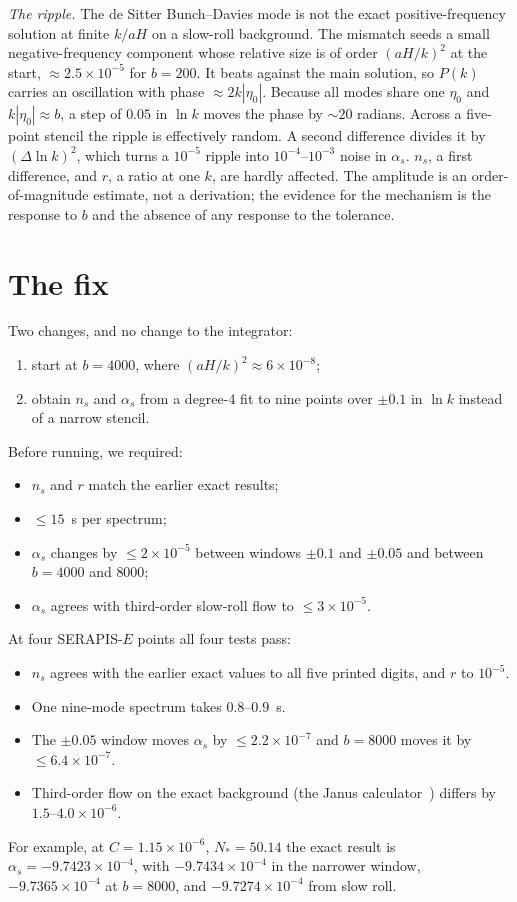 \documentclass[aps,prd,twocolumn,superscriptaddress,nofootinbib,showkeys]{revtex4-2}
\begin{document}
\emph{The ripple.} The de Sitter Bunch--Davies mode is not the exact positive-frequency solution at finite $k/aH$ on a slow-roll background. The mismatch seeds a small negative-frequency component whose relative size is of order $(aH/k)^2$ at the start, $\approx2.5\times10^{-5}$ for $b=200$. It beats against the main solution, so $P(k)$ carries an oscillation with phase $\approx2k|\eta_0|$. Because all modes share one $\eta_0$ and $k|\eta_0|\approx b$, a step of $0.05$ in $\ln k$ moves the phase by $\sim20$ radians. Across a five-point stencil the ripple is effectively random. A second difference divides it by $(\Delta\ln k)^2$, which turns a $10^{-5}$ ripple into $10^{-4}$--$10^{-3}$ noise in $\alpha_s$. $n_s$, a first difference, and $r$, a ratio at one $k$, are hardly affected. The amplitude is an order-of-magnitude estimate, not a derivation; the evidence for the mechanism is the response to $b$ and the absence of any response to the tolerance.

\section{The fix}
Two changes, and no change to the integrator:
\begin{enumerate}
\item start at $b=4000$, where $(aH/k)^2\approx6\times10^{-8}$;
\item obtain $n_s$ and $\alpha_s$ from a degree-4 fit to nine points over $\pm0.1$ in $\ln k$ instead of a narrow stencil.
\end{enumerate}
Before running, we required:
\begin{itemize}
\item[(T1)] $n_s$ and $r$ match the earlier exact results;
\item[(T2)] $\le15$~s per spectrum;
\item[(T3)] $\alpha_s$ changes by $\le2\times10^{-5}$ between windows $\pm0.1$ and $\pm0.05$ and between $b=4000$ and $8000$;
\item[(T4)] $\alpha_s$ agrees with third-order slow-roll flow to $\le3\times10^{-5}$.
\end{itemize}

At four SERAPIS-$E$ points all four tests pass:
\begin{itemize}
\item $n_s$ agrees with the earlier exact values to all five printed digits, and $r$ to $10^{-5}$.
\item One nine-mode spectrum takes $0.8$--$0.9$~s.
\item The $\pm0.05$ window moves $\alpha_s$ by $\le2.2\times10^{-7}$ and $b=8000$ moves it by $\le6.4\times10^{-7}$.
\item Third-order flow on the exact background (the Janus calculator~\cite{Janus}) differs by $1.5$--$4.0\times10^{-6}$.
\end{itemize}
For example, at $C=1.15\times10^{-6}$, $N_*=50.14$ the exact result is $\alpha_s=-9.7423\times10^{-4}$, with $-9.7434\times10^{-4}$ in the narrower window, $-9.7365\times10^{-4}$ at $b=8000$, and $-9.7274\times10^{-4}$ from slow roll.
\end{document}
